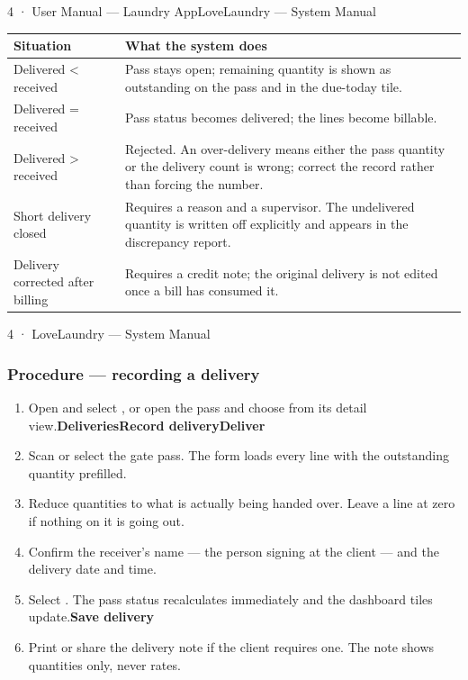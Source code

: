 \documentclass[11pt,a4paper,oneside]{book}
\begin{document}
4 · User Manual — Laundry AppLoveLaundry — System Manual

\begin{center}\small
\begin{tabularx}{\linewidth}{|X|X|}
\hline
\rowcolor{lightgrey}
\textbf{Situation} & \textbf{What the system does} \\ \hline
Delivered < received & Pass stays open; remaining quantity is shown as outstanding on the pass and in the due-today tile. \\ \hline
Delivered = received & Pass status becomes delivered; the lines become billable. \\ \hline
Delivered > received & Rejected. An over-delivery means either the pass quantity or the delivery count is wrong; correct the record rather than forcing the number. \\ \hline
Short delivery closed & Requires a reason and a supervisor. The undelivered quantity is written off explicitly and appears in the discrepancy report. \\ \hline
Delivery corrected after billing & Requires a credit note; the original delivery is not edited once a bill has consumed it. \\ \hline
\end{tabularx}
\end{center}
4 · LoveLaundry — System Manual

\subsubsection*{Procedure — recording a delivery}
\begin{enumerate}
\item Open  and select , or open the pass and choose  from its detail view.\textbf{Deliveries}\textbf{Record delivery}\textbf{Deliver}
\item Scan or select the gate pass. The form loads every line with the outstanding quantity prefilled.
\item Reduce quantities to what is actually being handed over. Leave a line at zero if nothing on it is going out.
\item Confirm the receiver's name — the person signing at the client — and the delivery date and time.
\item Select . The pass status recalculates immediately and the dashboard tiles update.\textbf{Save delivery}
\item Print or share the delivery note if the client requires one. The note shows quantities only, never rates.
\end{enumerate}
\end{document}
